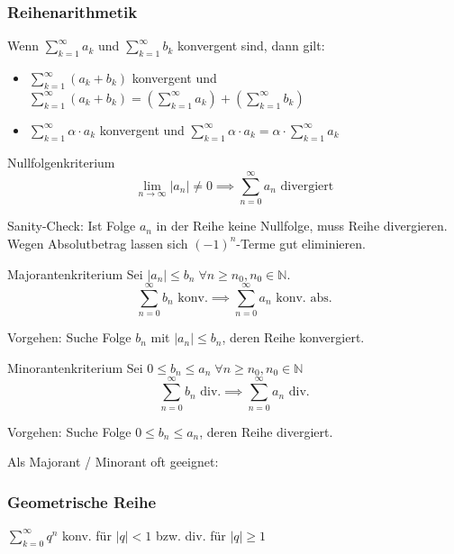 \documentclass[a4paper,10pt]{article}
\def\limn{\lim_{n\to \infty}}
\def\sumk{\sum_{k=1}^\infty}
\def\sumn{\sum_{n=0}^\infty}
\def\N{\mathbb{N}}
\begin{document}
\subsubsection{Reihenarithmetik}
Wenn $\sumk a_k$ und $\sumk b_k$ konvergent sind, dann gilt:
\begin{itemize}
 \item $\sumk (a_k + b_k)$ konvergent und $\sumk (a_k + b_k) = \left( \sumk a_k \right) + \left( \sumk b_k \right)$
 \item $\sumk \alpha \cdot a_k$ konvergent und $\sumk \alpha \cdot a_k = \alpha \cdot \sumk a_k$
\end{itemize}


\begin{mainbox}{Nullfolgenkriterium}
\[ \limn \left| a_n \right| \neq 0 \implies \sumn{a_n} \text{ divergiert} \]
\end{mainbox}
Sanity-Check: Ist Folge $a_n$ in der Reihe keine Nullfolge, muss Reihe divergieren. Wegen Absolutbetrag lassen sich $(-1)^n$-Terme gut eliminieren.

\begin{mainbox}{Majorantenkriterium}
Sei $\left| a_n \right| \leq b_n \; \forall n \geq n_0, n_0 \in \N$.
\[ \sumn{b_n} \text{ konv.} \implies \sumn{a_n} \text{ konv. abs.} \]
\end{mainbox}
Vorgehen: Suche Folge $b_n$ mit $\left| a_n \right| \leq b_n$, deren Reihe konvergiert.

\begin{mainbox}{Minorantenkriterium}
Sei $0 \leq b_n \leq a_n \; \forall n \geq n_0, n_0 \in \N$
\[ \sumn{b_n} \text{ div.} \implies \sumn{a_n} \text{ div.} \]
\end{mainbox}
Vorgehen: Suche Folge $0 \leq b_n \leq a_n$, deren Reihe divergiert.

Als Majorant / Minorant oft geeignet:
\subsubsection{Geometrische Reihe} 
$\sum_{k=0}^\infty q^n$ konv. für $|q| < 1$ bzw. div. für $|q| \ge 1$
\end{document}

